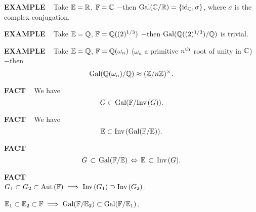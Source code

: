 \vspace{0.1cm}

\begin{x}{\small\bf EXAMPLE} \ %
Take $\mathbb{E} = \mathbb{R}$, $\mathbb{F} = \mathbb{C}$ $-$then $\text{Gal}(\mathbb{C}/\mathbb{R}) = \{\text{id}_{\mathbb{C}},\sigma\}$, where $\sigma$ is the complex conjugation.
\end{x}

\vspace{0.1cm}

\begin{x}{\small\bf EXAMPLE} \ %
Take $\mathbb{E} = \mathbb{Q}$, $\mathbb{F} = \mathbb{Q}((2)^{1/3})$ $-$then $\text{Gal}(\mathbb{Q}((2)^{1/3}) / \mathbb{Q})$ is trivial.
\end{x}

\vspace{0.1cm}

\begin{x}{\small\bf EXAMPLE}  \ %
Take $\mathbb{E} = \mathbb{Q}$, $\mathbb{F} = \mathbb{Q}(\omega_n)$ ($\omega_n$ a primitive $n^{\text{th}}$ root of unity in $\mathbb{C}$) $-$then 
\[
\text{Gal}(\mathbb{Q}(\omega_n) / \mathbb{Q}) \approx (\mathbb{Z}/n\mathbb{Z})^\times.
\]
\end{x}

\vspace{0.1cm}

\begin{x}{\small\bf FACT} \ %
We have
\[
G \subset \text{Gal}(\mathbb{F}/\text{Inv}\hspace{0.05cm}(G)).
\]
\end{x}


\begin{x}{\small\bf FACT} \ %
We have
\[
\mathbb{E} \subset \text{Inv}\hspace{0.05cm}(\text{Gal}(\mathbb{F}/\mathbb{E})).
\]
\end{x}

\vspace{0.1cm}

\begin{x}{\small\bf FACT} \ %
\[
G \hspace{0.05cm} \subset\hspace{0.05cm} \text{Gal}(\mathbb{F}/\mathbb{E}) \hspace{0.05cm}\Leftrightarrow\hspace{0.05cm} \mathbb{E} \hspace{0.05cm}\subset\hspace{0.05cm} \text{Inv}\hspace{0.05cm}(G).
\]
\end{x}

\vspace{0.1cm}


\begin{x}{\small\bf FACT} \ %
\\

\qquad\qquad \textbullet \quad $G_1 \subset G_2 \subset \text{Aut}\hspace{0.05 cm}(\mathbb{F}) \implies \text{Inv}\hspace{0.05cm}(G_1) \supset \text{Inv}\hspace{0.05cm}(G_2)$.

\vspace{0.1cm}

\qquad\qquad \textbullet \quad $\mathbb{E}_1 \subset \mathbb{E}_2 \subset \mathbb{F} \implies \text{Gal}(\mathbb{F}/\mathbb{E}_2) \subset \text{Gal}(\mathbb{F}/\mathbb{E}_1)$.

\end{x}

